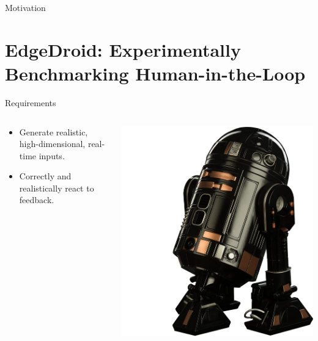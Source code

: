 \documentclass[aspectratio=1610]{beamer}
\begin{document}
\begin{ssframe}{Motivation}
    \begin{center}
        \vspace{.1\textheight}%
    \end{center}
\end{ssframe}

\section{EdgeDroid: Experimentally Benchmarking Human-in-the-Loop}
\begin{ssframe}{Requirements}
    \begin{columns}[onlytextwidth]
        \begin{column}{.5\linewidth}
            \begin{itemize}
                \itemsep2em
                \item Generate realistic, high-dimensional, real-time inputs.
                \item Correctly and realistically react to feedback.
            \end{itemize}
        \end{column}%
        \begin{column}{.5\linewidth}
            \centering%
            \includegraphics[width=.7\linewidth]{img/astromech.png}
        \end{column}
    \end{columns}
\end{ssframe}
\end{document}
